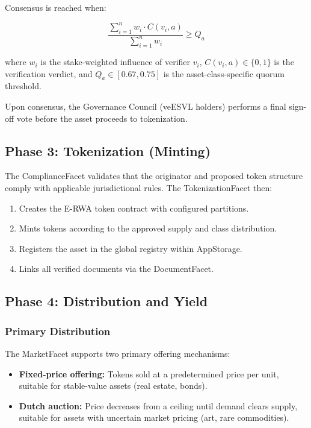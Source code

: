 \documentclass[11pt,a4paper]{article}
\begin{document}
Consensus is reached when:

\begin{equation}
    \frac{\sum_{i=1}^{n} w_i \cdot C(v_i, a)}{\sum_{i=1}^{n} w_i} \geq Q_a
\end{equation}

\noindent where $w_i$ is the stake-weighted influence of verifier $v_i$, $C(v_i, a) \in \{0, 1\}$ is the verification verdict, and $Q_a \in [0.67, 0.75]$ is the asset-class-specific quorum threshold.

Upon consensus, the Governance Council (veESVL holders) performs a final sign-off vote before the asset proceeds to tokenization.

\subsection{Phase 3: Tokenization (Minting)}

The ComplianceFacet validates that the originator and proposed token structure comply with applicable jurisdictional rules. The TokenizationFacet then:

\begin{enumerate}[nosep]
    \item Creates the E-RWA token contract with configured partitions.
    \item Mints tokens according to the approved supply and class distribution.
    \item Registers the asset in the global registry within AppStorage.
    \item Links all verified documents via the DocumentFacet.
\end{enumerate}

\subsection{Phase 4: Distribution and Yield}

\subsubsection{Primary Distribution}

The MarketFacet supports two primary offering mechanisms:

\begin{itemize}[nosep]
    \item \textbf{Fixed-price offering:} Tokens sold at a predetermined price per unit, suitable for stable-value assets (real estate, bonds).
    \item \textbf{Dutch auction:} Price decreases from a ceiling until demand clears supply, suitable for assets with uncertain market pricing (art, rare commodities).
\end{itemize}
\end{document}
